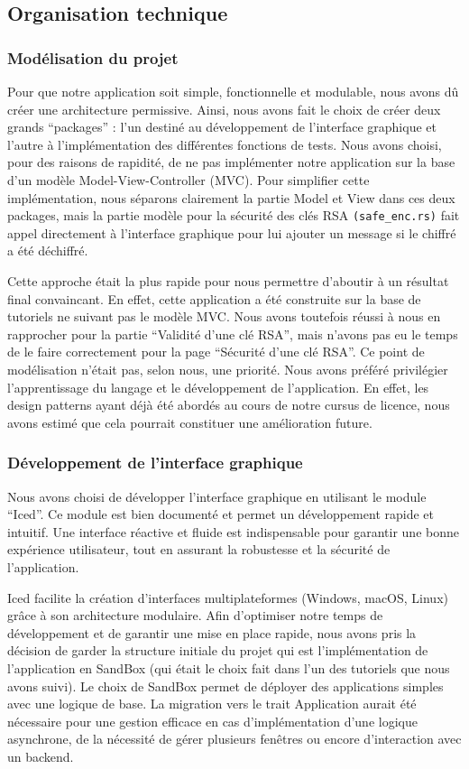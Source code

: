 \documentclass[12pt]{article} %
\begin{document}
	\subsection{Organisation technique}
		\subsubsection{Modélisation du projet}
		
	Pour que notre application soit simple, fonctionnelle et modulable, nous avons dû créer une architecture permissive. Ainsi, nous avons fait le choix de créer deux grands “packages” : l’un destiné au développement de l'interface graphique et l'autre à l'implémentation des différentes fonctions de tests. Nous avons choisi, pour des raisons de rapidité, de ne pas implémenter notre application sur la base d'un modèle Model-View-Controller (MVC). Pour simplifier cette implémentation, nous séparons clairement la partie Model et View dans ces deux packages, mais la partie modèle pour la sécurité des clés RSA \texttt{(safe\_enc.rs)} fait appel directement à l'interface graphique pour lui ajouter un message si le chiffré a été déchiffré.
	
Cette approche était la plus rapide pour nous permettre d’aboutir à un résultat final convaincant. En effet, cette application a été construite sur la base de tutoriels ne suivant pas le modèle MVC. Nous avons toutefois réussi à nous en rapprocher pour la partie “Validité d’une clé RSA”, mais n’avons pas eu le temps de le faire correctement pour la page “Sécurité d’une clé RSA”. Ce point de modélisation n’était pas, selon nous, une priorité. Nous avons préféré privilégier l’apprentissage du langage et le développement de l’application. En effet, les design patterns ayant déjà été abordés au cours de notre cursus de licence, nous avons estimé que cela pourrait constituer une amélioration future.

		\subsubsection{Développement de l’interface graphique}
		Nous avons choisi de développer l'interface graphique en utilisant le module “Iced”. Ce module est bien documenté et permet un développement rapide et intuitif. Une interface réactive et fluide est indispensable pour garantir une bonne expérience utilisateur, tout en assurant la robustesse et la sécurité de l'application.
		
Iced facilite la création d'interfaces multiplateformes (Windows, macOS, Linux) grâce à son architecture modulaire. Afin d’optimiser notre temps de développement et de garantir une mise en place rapide, nous avons pris la décision de garder la structure initiale du projet qui est l’implémentation de l’application en SandBox (qui était le choix fait dans l’un des tutoriels que nous avons suivi). Le choix de SandBox permet de déployer des applications simples avec une logique de base. La migration vers le trait Application aurait été nécessaire pour une gestion efficace en cas d’implémentation d’une logique asynchrone, de la nécessité de gérer plusieurs fenêtres ou encore d’interaction avec un backend.
\end{document}
